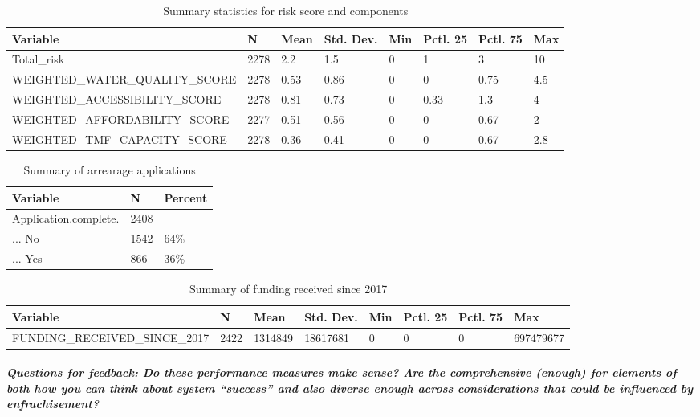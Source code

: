 \documentclass[
]{article}
\begin{document}
\begin{table}

\caption{\label{tab:tabular overview of DVs}Summary statistics for risk score and components}
\centering
\begin{tabular}[t]{llllllll}
\toprule
Variable & N & Mean & Std. Dev. & Min & Pctl. 25 & Pctl. 75 & Max\\
\midrule
Total\_risk & 2278 & 2.2 & 1.5 & 0 & 1 & 3 & 10\\
WEIGHTED\_WATER\_QUALITY\_SCORE & 2278 & 0.53 & 0.86 & 0 & 0 & 0.75 & 4.5\\
WEIGHTED\_ACCESSIBILITY\_SCORE & 2278 & 0.81 & 0.73 & 0 & 0.33 & 1.3 & 4\\
WEIGHTED\_AFFORDABILITY\_SCORE & 2277 & 0.51 & 0.56 & 0 & 0 & 0.67 & 2\\
WEIGHTED\_TMF\_CAPACITY\_SCORE & 2278 & 0.36 & 0.41 & 0 & 0 & 0.67 & 2.8\\
\bottomrule
\end{tabular}
\end{table}

\begin{table}

\caption{\label{tab:tabular overview of DVs}Summary of arrearage applications}
\centering
\begin{tabular}[t]{lll}
\toprule
Variable & N & Percent\\
\midrule
Application.complete. & 2408 & \\
... No & 1542 & 64\%\\
... Yes & 866 & 36\%\\
\bottomrule
\end{tabular}
\end{table}

\begin{table}

\caption{\label{tab:tabular overview of DVs}Summary of funding received since 2017}
\centering
\begin{tabular}[t]{llllllll}
\toprule
Variable & N & Mean & Std. Dev. & Min & Pctl. 25 & Pctl. 75 & Max\\
\midrule
FUNDING\_RECEIVED\_SINCE\_2017 & 2422 & 1314849 & 18617681 & 0 & 0 & 0 & 697479677\\
\bottomrule
\end{tabular}
\end{table}

\hypertarget{questions-for-feedback-do-these-performance-measures-make-sense-are-the-comprehensive-enough-for-elements-of-both-how-you-can-think-about-system-success-and-also-diverse-enough-across-considerations-that-could-be-influenced-by-enfrachisement}{%
\subparagraph{Questions for feedback: Do these performance measures make
sense? Are the comprehensive (enough) for elements of both how you can
think about system ``success'' and also diverse enough across
considerations that could be influenced by
enfrachisement?}\label{questions-for-feedback-do-these-performance-measures-make-sense-are-the-comprehensive-enough-for-elements-of-both-how-you-can-think-about-system-success-and-also-diverse-enough-across-considerations-that-could-be-influenced-by-enfrachisement}}
\end{document}

